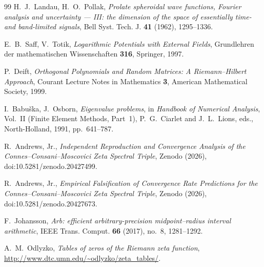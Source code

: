 \documentclass[11pt,a4paper]{article}
\begin{document}
\begin{thebibliography}{99}
H.~J.~Landau, H.~O.~Pollak,
\emph{Prolate spheroidal wave functions, Fourier analysis and uncertainty ---
III: the dimension of the space of essentially time- and band-limited signals},
Bell Syst. Tech. J. \textbf{41} (1962), 1295--1336.

E.~B.~Saff, V.~Totik,
\emph{Logarithmic Potentials with External Fields},
Grundlehren der mathematischen Wissenschaften \textbf{316}, Springer, 1997.

P.~Deift,
\emph{Orthogonal Polynomials and Random Matrices: A Riemann--Hilbert Approach},
Courant Lecture Notes in Mathematics \textbf{3}, American Mathematical Society,
1999.

I.~Babu\v{s}ka, J.~Osborn,
\emph{Eigenvalue problems}, in \emph{Handbook of Numerical Analysis}, Vol.~II
(Finite Element Methods, Part~1), P.~G.~Ciarlet and J.~L.~Lions, eds.,
North-Holland, 1991, pp.~641--787.

R.~Andrews, Jr.,
\emph{Independent Reproduction and Convergence Analysis of the
Connes--Consani--Moscovici Zeta Spectral Triple}, Zenodo (2026),
doi:10.5281/zenodo.20427499.

R.~Andrews, Jr.,
\emph{Empirical Falsification of Convergence Rate Predictions for the
Connes--Consani--Moscovici Zeta Spectral Triple}, Zenodo (2026),
doi:10.5281/zenodo.20427673.

F.~Johansson,
\emph{Arb: efficient arbitrary-precision midpoint--radius interval arithmetic},
IEEE Trans. Comput. \textbf{66} (2017), no.~8, 1281--1292.

A.~M.~Odlyzko,
\emph{Tables of zeros of the Riemann zeta function},
\url{http://www.dtc.umn.edu/~odlyzko/zeta_tables/}.

\end{thebibliography}
\end{document}
